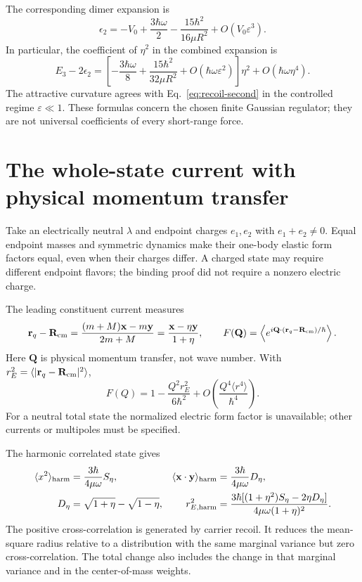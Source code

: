 The corresponding dimer expansion is
\begin{equation}
 \epsilon_2=-V_0+\frac{3\hbar\omega}{2}
       -\frac{15\hbar^2}{16\mu R^2}
       +O(V_0\varepsilon^3).
\end{equation}
In particular, the coefficient of $\eta^2$ in the combined expansion is
\begin{equation}
 E_3-2\epsilon_2=
 \left[-\frac{3\hbar\omega}{8}
       +\frac{15\hbar^2}{32\mu R^2}
       +O(\hbar\omega\varepsilon^2)\right]\eta^2
       +O(\hbar\omega\eta^4).
\end{equation}
The attractive curvature agrees with Eq.~\eqref{eq:recoil-second} in the controlled regime $\varepsilon\ll1$. These formulas concern the chosen finite Gaussian regulator; they are not universal coefficients of every short-range force.

\section{The whole-state current with physical momentum transfer}
\label{sec:current}
Take an electrically neutral $\lambda$ and endpoint charges $e_1,e_2$ with $e_1+e_2\ne0$. Equal endpoint masses and symmetric dynamics make their one-body elastic form factors equal, even when their charges differ. A charged state may require different endpoint flavors; the binding proof did not require a nonzero electric charge.

The leading constituent current measures
\begin{equation}
 \mathbf r_q-\mathbf R_{\rm cm}
 =\frac{(m+M)\mathbf x-m\mathbf y}{2m+M}
 =\frac{\mathbf x-\eta\mathbf y}{1+\eta},\qquad
 F(\mathbf Q)=
 \left\langle e^{i\mathbf Q\cdot(\mathbf r_q-\mathbf R_{\rm cm})/\hbar}
 \right\rangle .
\end{equation}
Here $\mathbf Q$ is physical momentum transfer, not wave number. With
$r_E^2=\langle|\mathbf r_q-\mathbf R_{\rm cm}|^2\rangle$,
\begin{equation}
 F(Q)=1-\frac{Q^2r_E^2}{6\hbar^2}
       +O\!\left(\frac{Q^4\langle r^4\rangle}{\hbar^4}\right).
 \label{eq:smallq}
\end{equation}
For a neutral total state the normalized electric form factor is unavailable; other currents or multipoles must be specified.

The harmonic correlated state gives
\begin{align}
 \langle x^2\rangle_{\rm harm}
 &=\frac{3\hbar}{4\mu\omega}S_\eta,&
 \langle\mathbf x\cdot\mathbf y\rangle_{\rm harm}
 &=\frac{3\hbar}{4\mu\omega}D_\eta,\\
 D_\eta&=\sqrt{1+\eta}-\sqrt{1-\eta},&
 r_{E,{\rm harm}}^2
 &=\frac{3\hbar[(1+\eta^2)S_\eta-2\eta D_\eta]}
         {4\mu\omega(1+\eta)^2}.
\end{align}
The positive cross-correlation is generated by carrier recoil. It reduces the mean-square radius relative to a distribution with the same marginal variance but zero cross-correlation. The total change also includes the change in that marginal variance and in the center-of-mass weights.

